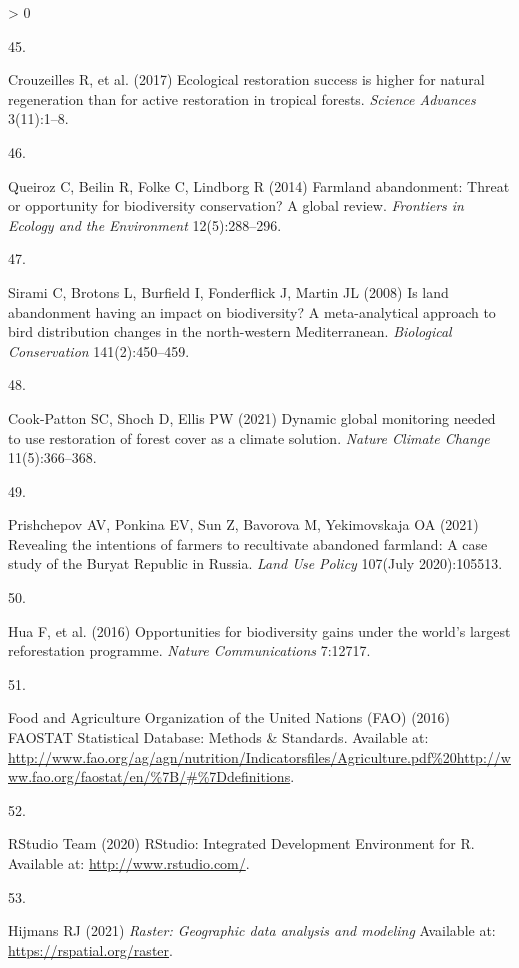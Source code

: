 \documentclass[9pt,twocolumn,twoside,lineno]{pnas-new}
\newlength{\csllabelwidth}
\newlength{\cslhangindent}
\newenvironment{CSLReferences}[2] %
 {%
  \setlength{\parindent}{0pt}
  \ifodd #1 \everypar{\setlength{\hangindent}{\cslhangindent}}\ignorespaces\fi
  \ifnum #2 > 0
  \setlength{\parskip}{#2\baselineskip}
  \fi
 }%
 {}
\newcommand{\CSLLeftMargin}[1]{\parbox[t]{\csllabelwidth}{#1}}
\newcommand{\CSLRightInline}[1]{\parbox[t]{\linewidth - \csllabelwidth}{#1}\break}
\begin{document}
\begin{CSLReferences}{0}{0}
\leavevmode\hypertarget{ref-Crouzeilles2017}{}%
\CSLLeftMargin{45. }
\CSLRightInline{Crouzeilles R, et al. (2017) {Ecological restoration success is higher for natural regeneration than for active restoration in tropical forests}. \emph{Science Advances} 3(11):1--8.}

\leavevmode\hypertarget{ref-Queiroz2014}{}%
\CSLLeftMargin{46. }
\CSLRightInline{Queiroz C, Beilin R, Folke C, Lindborg R (2014) {Farmland abandonment: Threat or opportunity for biodiversity conservation? A global review}. \emph{Frontiers in Ecology and the Environment} 12(5):288--296.}

\leavevmode\hypertarget{ref-Sirami2008}{}%
\CSLLeftMargin{47. }
\CSLRightInline{Sirami C, Brotons L, Burfield I, Fonderflick J, Martin JL (2008) {Is land abandonment having an impact on biodiversity? A meta-analytical approach to bird distribution changes in the north-western Mediterranean}. \emph{Biological Conservation} 141(2):450--459.}

\leavevmode\hypertarget{ref-Cook-Patton2021}{}%
\CSLLeftMargin{48. }
\CSLRightInline{Cook-Patton SC, Shoch D, Ellis PW (2021) {Dynamic global monitoring needed to use restoration of forest cover as a climate solution}. \emph{Nature Climate Change} 11(5):366--368.}

\leavevmode\hypertarget{ref-Prishchepov2021a}{}%
\CSLLeftMargin{49. }
\CSLRightInline{Prishchepov AV, Ponkina EV, Sun Z, Bavorova M, Yekimovskaja OA (2021) {Revealing the intentions of farmers to recultivate abandoned farmland: A case study of the Buryat Republic in Russia}. \emph{Land Use Policy} 107(July 2020):105513.}

\leavevmode\hypertarget{ref-Hua2016}{}%
\CSLLeftMargin{50. }
\CSLRightInline{Hua F, et al. (2016) {Opportunities for biodiversity gains under the world's largest reforestation programme}. \emph{Nature Communications} 7:12717.}

\leavevmode\hypertarget{ref-FAO2016}{}%
\CSLLeftMargin{51. }
\CSLRightInline{Food and Agriculture Organization of the United Nations (FAO) (2016) {FAOSTAT Statistical Database: Methods {\&} Standards}. Available at: \url{http://www.fao.org/ag/agn/nutrition/Indicatorsfiles/Agriculture.pdf\%20http://www.fao.org/faostat/en/\%7B/\#\%7Ddefinitions}.}

\leavevmode\hypertarget{ref-RStudio}{}%
\CSLLeftMargin{52. }
\CSLRightInline{RStudio Team (2020) {RStudio: Integrated Development Environment for R}. Available at: \url{http://www.rstudio.com/}.}

\leavevmode\hypertarget{ref-R-raster}{}%
\CSLLeftMargin{53. }
\CSLRightInline{Hijmans RJ (2021) \emph{Raster: Geographic data analysis and modeling} Available at: \url{https://rspatial.org/raster}.}


\end{CSLReferences}
\end{document}
